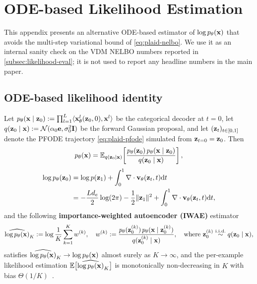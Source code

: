 \documentclass{article}
\begin{document}
\clearpage

\section{ODE-based Likelihood Estimation}
\label{app:ode-likelihood}

This appendix presents an alternative ODE-based estimator of $\log p_\theta({\mathbf x})$ that avoids the multi-step variational bound of \cref{eq:plaid-nelbo}. We use it as an internal sanity check on the VDM NELBO numbers reported in \cref{subsec:likelihood-eval}; it is not used to report any headline numbers in the main paper.

\subsection{ODE-based likelihood identity}
\label{subsec:ode-likelihood}
\begin{lemma}
\label{lem:ode-likelihood}
Let $p_\theta({\mathbf x} \mid {\mathbf z}_0) := \prod_{l=1}^L \langle {\mathbf x}_\theta^l({\mathbf z}_0, 0), {\mathbf x}^l \rangle$ be the categorical decoder at $t = 0$, let $q({\mathbf z}_0 \mid {\mathbf x}) := \mathcal{N}(\alpha_0 {\mathbf e}, \sigma_0^2 {\mathbf I})$ be the forward Gaussian proposal, and let $({\mathbf z}_t)_{t \in [0, 1]}$ denote the PFODE trajectory \cref{eq:plaid-pfode} simulated from ${\mathbf z}_{t=0} = {\mathbf z}_0$. Then
\begin{equation}\label{eq:ode-iw-identity}
  p_\theta({\mathbf x}) = \mathbb{E}_{q({\mathbf z}_0 \mid {\mathbf x})}\!\left[\frac{p_\theta({\mathbf z}_0)\, p_\theta({\mathbf x} \mid {\mathbf z}_0)}{q({\mathbf z}_0 \mid {\mathbf x})}\right],
\end{equation}
\begin{align}\label{eq:ode-cov-exact}
  \log p_\theta({\mathbf z}_0) &= \log p({\mathbf z}_1) + \int_0^1 \nabla \cdot {\mathbf v}_\theta({\mathbf z}_t, t){\mathrm{d}} t \notag\\
  &= -\frac{L d_e}{2} \log(2\pi) - \frac{1}{2}\|{\mathbf z}_1\|^2 + \int_0^1 \nabla \cdot {\mathbf v}_\theta({\mathbf z}_t, t){\mathrm{d}} t,
\end{align}
and the following \textbf{importance-weighted autoencoder (IWAE)} \citep{burda2015importance} estimator
\begin{equation}\label{eq:ode-iwae}
  \widehat{\log p_\theta({\mathbf x})}_K := \log \frac{1}{K} \sum_{k=1}^K w^{(k)}, \quad w^{(k)} := \frac{p_\theta({\mathbf z}_0^{(k)})\, p_\theta({\mathbf x} \mid {\mathbf z}_0^{(k)})}{q({\mathbf z}_0^{(k)} \mid {\mathbf x})},
  \quad\text{where}~{\mathbf z}_0^{(k)} \stackrel{\mathrm{i.i.d.}}{\sim} q({\mathbf z}_0 \mid {\mathbf x}),
\end{equation}
satisfies $\widehat{\log p_\theta({\mathbf x})}_K \to \log p_\theta({\mathbf x})$ almost surely as $K \to \infty$, and the per-example likelihood estimation $\mathbb{E}\bigl[\widehat{\log p_\theta({\mathbf x})}_K\bigr]$ is monotonically non-decreasing in $K$ with bias $\Theta(1/K)$~\citep{nowozin2018debiasing}.
\end{lemma}
\end{document}
